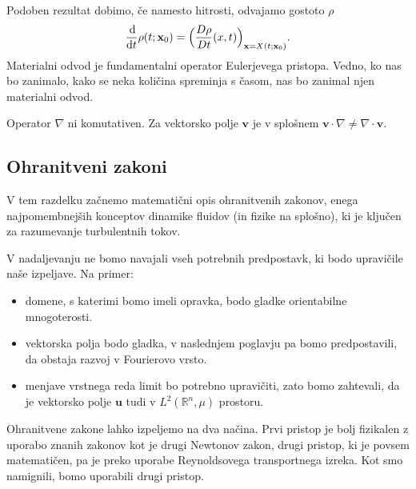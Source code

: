 \documentclass[mat2, tisk]{fmfdelo}
\newcommand{\R}{\mathbb R}
\newcommand{\bd}{\textbf}
\begin{document}
Podoben rezultat dobimo, če namesto hitrosti, odvajamo gostoto $\rho$
\begin{equation}
\frac{\dif }{\dif t} \rho(t; \bd{x}_0) = \Big(\frac{D \rho}{Dt}(x, t) \Big)_{\bd{x} = X(t; \bd{x}_0)}.
\end{equation}
Materialni odvod je fundamentalni operator Eulerjevega pristopa. Vedno, ko nas bo 
zanimalo, kako se neka količina spreminja s časom, nas bo zanimal njen materialni odvod.

\begin{opomba}
Operator $\nabla$ ni komutativen. Za vektorsko polje $\bd{v}$ je v splošnem $\bd{v} \cdot \nabla \neq \nabla \cdot \bd{v}$.
\end{opomba}


\subsection{Ohranitveni zakoni}
\label{sec:ohranitveni-zakoni}

V tem razdelku začnemo matematični opis ohranitvenih zakonov, enega najpomembnejših konceptov dinamike fluidov (in fizike na splošno), 
ki je ključen za razumevanje turbulentnih tokov. 

\begin{opomba}
V nadaljevanju ne bomo navajali vseh potrebnih predpostavk, ki bodo upravičile naše izpeljave. Na primer:
\begin{itemize}
  \item domene, s katerimi bomo imeli opravka, bodo gladke orientabilne mnogoterosti.
  \item vektorska polja bodo gladka, v naslednjem poglavju pa bomo predpostavili, da 
  obstaja razvoj v Fourierovo vrsto.
  \item menjave vrstnega reda limit bo potrebno upravičiti, zato bomo zahtevali, da je 
  vektorsko polje $\bd{u}$ tudi v $L^2(\R^n, \mu)$ prostoru.
\end{itemize}
\end{opomba}

Ohranitvene zakone lahko izpeljemo na dva načina. Prvi pristop je bolj fizikalen 
z uporabo znanih zakonov kot je drugi Newtonov zakon, drugi pristop, ki je povsem matematičen,
pa je preko uporabe Reynoldsovega transportnega izreka. Kot smo namignili, bomo uporabili drugi 
pristop. 
\end{document}
